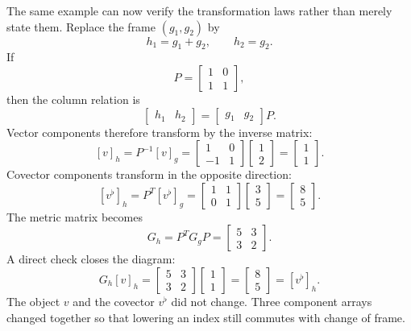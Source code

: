 The same example can now verify the transformation laws rather than merely state them.  Replace the frame \((g_1,g_2)\) by
\[
  h_1=g_1+g_2,
  \qquad
  h_2=g_2.
\]
If
\[
  P=
  \begin{bmatrix}
    1&0\\
    1&1
  \end{bmatrix},
\]
then the column relation is
\[
  \begin{bmatrix}h_1&h_2\end{bmatrix}
  =
  \begin{bmatrix}g_1&g_2\end{bmatrix}P.
\]
Vector components therefore transform by the inverse matrix:
\[
  [v]_h=P^{-1}[v]_g
  =
  \begin{bmatrix}
    1&0\\
    -1&1
  \end{bmatrix}
  \begin{bmatrix}1\\2\end{bmatrix}
  =
  \begin{bmatrix}1\\1\end{bmatrix}.
\]
Covector components transform in the opposite direction:
\[
  [v^\flat]_h=P^T[v^\flat]_g
  =
  \begin{bmatrix}
    1&1\\
    0&1
  \end{bmatrix}
  \begin{bmatrix}3\\5\end{bmatrix}
  =
  \begin{bmatrix}8\\5\end{bmatrix}.
\]
The metric matrix becomes
\[
  G_h=P^TG_gP
  =
  \begin{bmatrix}
    5&3\\
    3&2
  \end{bmatrix}.
\]
A direct check closes the diagram:
\[
  G_h[v]_h
  =
  \begin{bmatrix}
    5&3\\
    3&2
  \end{bmatrix}
  \begin{bmatrix}1\\1\end{bmatrix}
  =
  \begin{bmatrix}8\\5\end{bmatrix}
  =[v^\flat]_h.
\]
The object \(v\) and the covector \(v^\flat\) did not change.  Three component arrays changed together so that lowering an index still commutes with change of frame.

